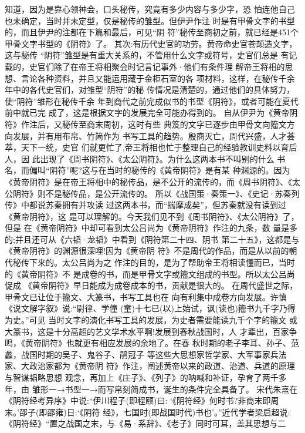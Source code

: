 \documentclass[12pt,UTF8]{ctexbook}
\begin{document}
知道，因为是靠心领神会，口头秘传，究竟有多少内容与多少字，恐
怕连他自己也未确定，当时并未定型，仅是秘传的雏型。但伊尹作注
时是有甲骨文字的书型的，而且伊尹的注都在下篇和最后，可见“阴
符”秘传至商初之前，就已经是451个甲骨文字书型的《阴符》了。
其次:有历代史官的功劳。黄帝命史官苍颉造文字，这与秘传
“阴符”雏型是有重大关系的，不管用什么文字或符号，史官们总是
有记载的，史官们除了在帝王将相聚会时记言记事外·他们有条件理
解帝王将相的思想、言论各种资料，并且又能运用藏于金柜石室的各
项材料，这样，在秘传千余年中的各代史官们，对雏型“阴符”的秘
传情况是清楚的，通过他们的具体努力，使“阴符”雏形在秘传千余
年到商代之前完成似书的书型《阴符》，或者可能在夏代前中就已完
成了，这是根据文字的发展完全可能办得到的。
自从伊尹为《黄帝阴符》作注后，又秘传至商末周初，这时有些
典笈的文字已逐步由甲骨文向籀文方向发展，并有用布帛、竹简作为
书写工具的趋势。殷商灭亡，周代兴盛，人才荟萃，天下一统，史官
们就更忙了,帝王将相也忙于整理自己的经验教训史料以育后人，因
此出现了《周书阴符》、《太公阴符》。为什么这两本书不叫别的什么
书名，而偏叫“阴符”呢?这与在当时的秘传的《黄帝阴符》是有某
种渊源的。因为《黄帝阴符》是在帝王将相中的秘传品，是不公开的流传的，而《周书阴符》、《太公阴符》则不是秘传品，是公开流传的。
所以《战国策·秦策一》、《史记·苏秦列传》中都说苏秦拥有并攻读
过这两本书，而“揣摩成矣”，但苏秦就没有读到过《黄帝阴符》，这
是可以理解的。今天我们见不到《周书阴符》、《太公阴符》了，但是
在《黄帝阴符》中却可看到太公吕尚为《黄帝阴符》作注的九条，数
量是多的;并且还可从《六韬·龙韬》中看到《阴符第二十四、阴书
第二十五》，这都是与《黄帝阴符》的渊源很深哩!因为《黄帝阴
符》不是周代的作品，而是从以前的朝代秘传下来的。太公吕尚为之
作注的目的，是为了帮助帝王将相读懂而已，当时的《黄帝阴符》不
是成卷的书，而是甲骨文字或籀文组成的书型。所以太公吕尚促成
《黄帝阴符》早日能成为成卷成本的书，贡献是很大的。
在周代盛世之际，甲骨文已让位于籀文、大篆书，书写工具也在
向有利集中成卷方向发展。许慎《说文解字叙》说:“尉律、学僮
(童)十七已(以)上始试，讽(读也)籀书九千字乃得为史。”可见
当时文字的演化书写工具的发展，为史者需要能读九千个字的籀文
或大篆书，这是十分高超的艺文学术水平啊!发展到春秋战国时，人
才辈出，百家争鸣，《黄帝阴符》也就更有相应发展的余地了。在春
秋时期的老子李耳、孙子、范蠡，战国时期的吴子、鬼谷子、鹃冠子
等这些大思想家哲学家、大军事家兵法家、大政治家都为《黄帝阴
符》作注，阐述黄帝以来的政道、治道、兵道的原理与智谋韬略思想
观念，再加上《庄子》、《列子》的呐喊和补证，孕育了两千多年，由
雏形一→书型一→而写帛刻简成书，诞生的条件完全具备了。
宋代朱熹在《阴符经考异序》中说:“伊川程子(即程颐)曰:
‘《阴符经》何时书?非商末即周末。’邵子(即邵雍)日:‘《阴符
经》，七国时(即战国时代)书也’。”近代学者梁启超说:《阴符经》“置之战国之末，与《易·系辞》、《老子》同时可耳，盖其思想与二
\end{document}
